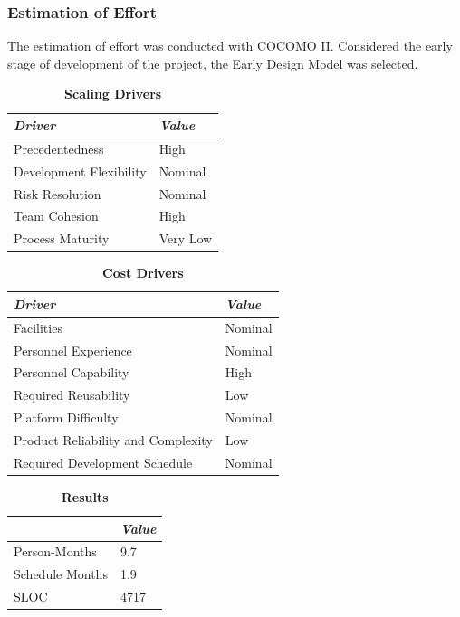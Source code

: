 \documentclass[conference,12pt]{IEEETran}
\begin{document}
\subsubsection{Estimation of Effort}
The estimation of effort was conducted with COCOMO II. Considered the 
early stage of development of the project, the Early Design Model was selected.\\
\FloatBarrier
\begin{table}[!h]
	\centering
	\caption{\textbf{Scaling Drivers}}
	{\renewcommand{\arraystretch}{1.1}%
		\begin{tabular}{|l|l|}
			\hline
			\textit{Driver} & \textit{Value} \\
			\hline
			Precedentedness & High \\
			\hline
			Development Flexibility & Nominal \\
			\hline
			Risk Resolution & Nominal \\
			\hline
			Team Cohesion & High \\
			\hline
			Process Maturity & Very Low \\
			\hline
	\end{tabular}}
\end{table}

\begin{table}[!h]
	\centering
	\caption{\textbf{Cost Drivers}}
	{\renewcommand{\arraystretch}{1.1}%
		\begin{tabular}{|l|l|}
			\hline
			\textit{Driver} & \textit{Value} \\
			\hline
			Facilities & Nominal \\
			\hline
			Personnel Experience & Nominal \\
			\hline
			Personnel Capability & High \\
			\hline
			Required Reusability & Low \\
			\hline
			Platform Difficulty & Nominal \\
			\hline
			Product Reliability and Complexity & Low \\
			\hline
			Required Development Schedule & Nominal \\
			\hline
	\end{tabular}}
\end{table}

\begin{table}[!h]
	\centering
	\caption{\textbf{Results}}
	{\renewcommand{\arraystretch}{1.1}%
		\begin{tabular}{|l|l|}
			\hline
			& \textit{Value} \\
			\hline
			Person-Months & 9.7 \\
			\hline
			Schedule Months & 1.9 \\
			\hline
			SLOC & 4717 \\
			\hline
	\end{tabular}}
\end{table}
\FloatBarrier
\end{document}
